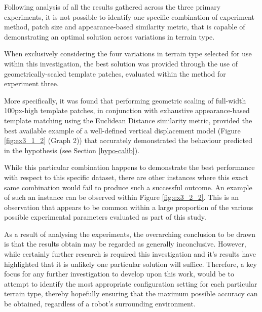Following analysis of all the results gathered across the three primary experiments, it is not possible to identify one specific combination of experiment method, patch size and appearance-based similarity metric, that is capable of demonstrating an optimal solution across variations in terrain type.


When exclusively considering the four variations in terrain type selected for use within this investigation, the best solution was provided through the use of geometrically-scaled template patches, evaluated within the method for experiment three.

More specifically, it was found that performing geometric scaling of full-width 100px-high template patches, in conjunction with exhaustive appearance-based template matching using the Euclidean Distance similarity metric, provided the best available example of a well-defined vertical displacement model (Figure \ref{fig:ex3_1_2} (Graph 2)) that accurately demonstrated the behaviour predicted in the hypothesis (see Section \ref{hypo-calib}).

While this particular combination happens to demonstrate the best performance with respect to this specific dataset, there are other instances where this exact same combination would fail to produce such a successful outcome. An example of such an instance can be observed within Figure \ref{fig:ex3_2_2}. This is an observation that appears to be common within a large proportion of the various possible experimental parameters evaluated as part of this study. 

As a result of analysing the experiments, the overarching conclusion to be drawn is that the results obtain may be regarded as generally inconclusive. However, while certainly further research is required this investigation and it's results have highlighted that it is unlikely one particular solution will suffice. Therefore, a key focus for any further investigation to develop upon this work, would be to attempt to identify the most appropriate configuration setting for each particular terrain type, thereby hopefully ensuring that the maximum possible accuracy can be obtained, regardless of a robot's surrounding environment. 
  

 
  

